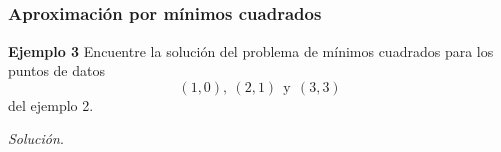 
\subsection{}

\begin{frame}\frametitle{Aproximación por mínimos cuadrados}
	
	\begin{ej}{\textbf{Ejemplo 3}}
		Encuentre la solución del problema de mínimos cuadrados para los puntos de datos
		\[
		(1,0),\  (2,1) \ \ \text{y} \ \ (3,3)
		\]
		del ejemplo 2.
	\end{ej}
	\textit{Solución}.
	
\end{frame}


\subsection{}

